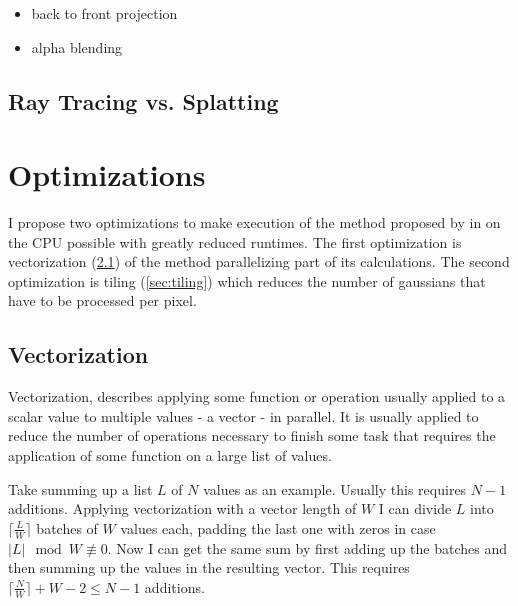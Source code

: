 \documentclass[a4paper, 11pt]{memoir}
\begin{document}
    \begin{itemize}
        \item back to front projection
        \item alpha blending
    \end{itemize}

    \section{Ray Tracing vs. Splatting}

    \chapter{Optimizations}
    \label{ch:optimizations}
    I propose two optimizations to make execution of the method proposed by \citeauthor{Rhodin:2015}
    in \cite{Rhodin:2015} on the CPU possible with greatly reduced runtimes.
    The first optimization is vectorization (\ref{sec:vectorization}) of the method
    parallelizing part of its calculations.
    The second optimization is tiling (\ref{sec:tiling}) which reduces the number of gaussians
    that have to be processed per pixel.

    \section{Vectorization}
    \label{sec:vectorization}
    Vectorization, describes applying some function or operation usually applied to a scalar value
    to multiple values - a vector - in parallel.
    It is usually applied to reduce the number of operations necessary to finish some task that
    requires the application of some function on a large list of values.

    Take summing up a list $L$ of $N$ values as an example. Usually this requires $N - 1$ additions.
    Applying vectorization with a vector length of $W$ I can divide $L$ into $\lceil \frac{L}{W} \rceil$
    batches of $W$ values each, padding the last one with zeros in case $|L| \mod W \not\equiv 0$. Now I
    can get the same sum by first adding up the batches and then summing up the values in the resulting
    vector. This requires $\lceil \frac{N}{W} \rceil + W - 2 \leq N - 1$ additions.
\end{document}

